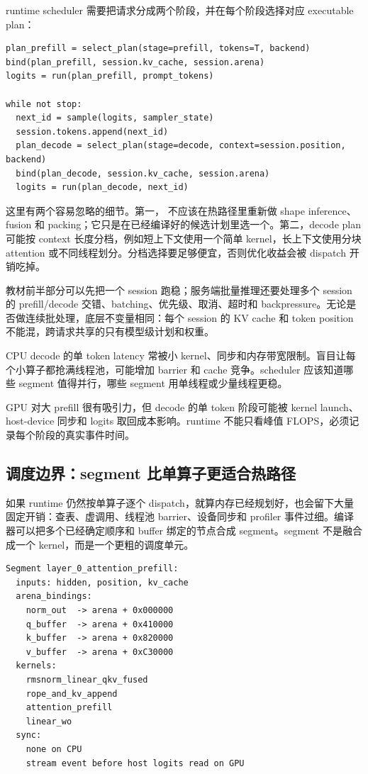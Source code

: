 runtime scheduler 需要把请求分成两个阶段，并在每个阶段选择对应 executable plan：

\begin{lstlisting}[numbers=none,caption={prefill/decode 调度主循环}]
plan_prefill = select_plan(stage=prefill, tokens=T, backend)
bind(plan_prefill, session.kv_cache, session.arena)
logits = run(plan_prefill, prompt_tokens)

while not stop:
  next_id = sample(logits, sampler_state)
  session.tokens.append(next_id)
  plan_decode = select_plan(stage=decode, context=session.position, backend)
  bind(plan_decode, session.kv_cache, session.arena)
  logits = run(plan_decode, next_id)
\end{lstlisting}

这里有两个容易忽略的细节。第一， 不应该在热路径里重新做 shape inference、fusion 和 packing；它只是在已经编译好的候选计划里选一个。第二，decode plan 可能按 context 长度分档，例如短上下文使用一个简单 kernel，长上下文使用分块 attention 或不同线程划分。分档选择要足够便宜，否则优化收益会被 dispatch 开销吃掉。

 教材前半部分可以先把一个 session 跑稳；服务端批量推理还要处理多个 session 的 prefill/decode 交错、batching、优先级、取消、超时和 backpressure。无论是否做连续批处理，底层不变量相同：每个 session 的 KV cache 和 token position 不能混，跨请求共享的只有模型级计划和权重。

 CPU decode 的单 token latency 常被小 kernel、同步和内存带宽限制。盲目让每个小算子都抢满线程池，可能增加 barrier 和 cache 竞争。scheduler 应该知道哪些 segment 值得并行，哪些 segment 用单线程或少量线程更稳。

 GPU 对大 prefill 很有吸引力，但 decode 的单 token 阶段可能被 kernel launch、host-device 同步和 logits 取回成本影响。runtime 不能只看峰值 FLOPS，必须记录每个阶段的真实事件时间。

\subsection{调度边界：segment 比单算子更适合热路径}

如果 runtime 仍然按单算子逐个 dispatch，就算内存已经规划好，也会留下大量固定开销：查表、虚调用、线程池 barrier、设备同步和 profiler 事件过细。编译器可以把多个已经确定顺序和 buffer 绑定的节点合成 segment。segment 不是融合成一个 kernel，而是一个更粗的调度单元。

\begin{lstlisting}[numbers=none,caption={executable plan 中的 segment 草图}]
Segment layer_0_attention_prefill:
  inputs: hidden, position, kv_cache
  arena_bindings:
    norm_out  -> arena + 0x000000
    q_buffer  -> arena + 0x410000
    k_buffer  -> arena + 0x820000
    v_buffer  -> arena + 0xC30000
  kernels:
    rmsnorm_linear_qkv_fused
    rope_and_kv_append
    attention_prefill
    linear_wo
  sync:
    none on CPU
    stream event before host logits read on GPU
\end{lstlisting}

